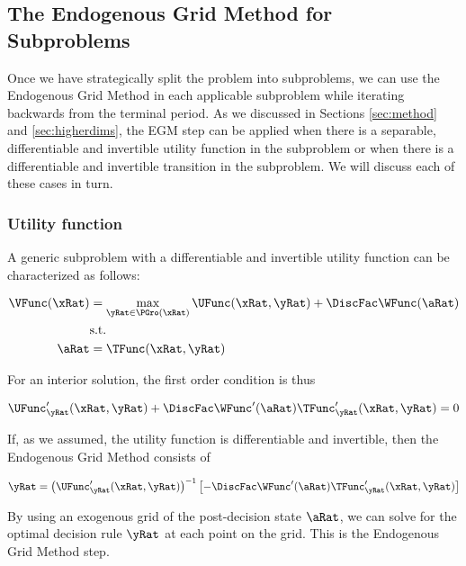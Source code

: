 \documentclass[\econtexRoot/SequentialEGM]{subfiles}
\begin{document}
\subsection{The Endogenous Grid Method for Subproblems}

Once we have strategically split the problem into subproblems, we can use the Endogenous Grid Method in each applicable subproblem while iterating backwards from the terminal period. As we discussed in Sections \ref{sec:method} and \ref{sec:higherdims}, the EGM step can be applied when there is a separable, differentiable and invertible utility function in the subproblem or when there is a differentiable and invertible transition in the subproblem. We will discuss each of these cases in turn.

\subsubsection{Utility function}

A generic subproblem with a differentiable and invertible utility function can be characterized as follows:

\begin{equation}
    \begin{split}
        \VFunc(\xRat) &  = \max_{\yRat  \in \PGro(\xRat)} \UFunc(\xRat, \yRat) + \DiscFac \WFunc(\aRat) \\
        & \text{s.t.} \\
        \aRat & = \TFunc(\xRat,\yRat)
    \end{split}
\end{equation}

For an interior solution, the first order condition is thus

\begin{equation}
    \UFunc'_{\yRat}(\xRat, \yRat) + \DiscFac \WFunc'(\aRat)\TFunc'_{\yRat}(\xRat,\yRat) = 0
\end{equation}

If, as we assumed, the utility function is differentiable and invertible, then the Endogenous Grid Method consists of

\begin{equation}
    \yRat = \left(\UFunc'_{\yRat}(\xRat, \yRat)\right)^{-1} \left[ -\DiscFac \WFunc'(\aRat)\TFunc'_{\yRat}(\xRat,\yRat)\right]
\end{equation}

By using an exogenous grid of the post-decision state $\aRat$, we can solve for the optimal decision rule $\yRat$ at each point on the grid. This is the Endogenous Grid Method step.
\end{document}
